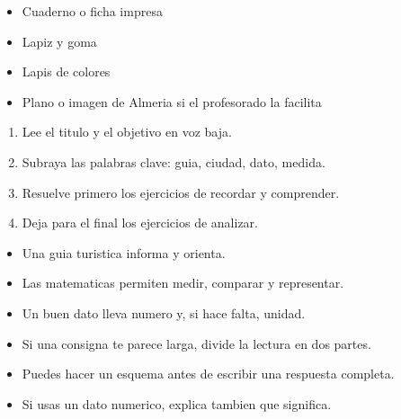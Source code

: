 \documentclass[12pt,a4paper]{article}
\begin{document}
        \FichaCabecera

        \begin{materialesbox}
        \begin{itemize}
    \item Cuaderno o ficha impresa
    \item Lapiz y goma
    \item Lapis de colores
    \item Plano o imagen de Almeria si el profesorado la facilita
\end{itemize}
        \end{materialesbox}

        \begin{pasosbox}
        \begin{enumerate}
    \item Lee el titulo y el objetivo en voz baja.
    \item Subraya las palabras clave: guia, ciudad, dato, medida.
    \item Resuelve primero los ejercicios de recordar y comprender.
    \item Deja para el final los ejercicios de analizar.
\end{enumerate}
        \end{pasosbox}

        \begin{recordatoriobox}
        \begin{itemize}
    \item Una guia turistica informa y orienta.
    \item Las matematicas permiten medir, comparar y representar.
    \item Un buen dato lleva numero y, si hace falta, unidad.
\end{itemize}
        \end{recordatoriobox}

        \begin{apoyobox}
        \begin{itemize}
    \item Si una consigna te parece larga, divide la lectura en dos partes.
    \item Puedes hacer un esquema antes de escribir una respuesta completa.
    \item Si usas un dato numerico, explica tambien que significa.
\end{itemize}
        \end{apoyobox}

\end{document}
